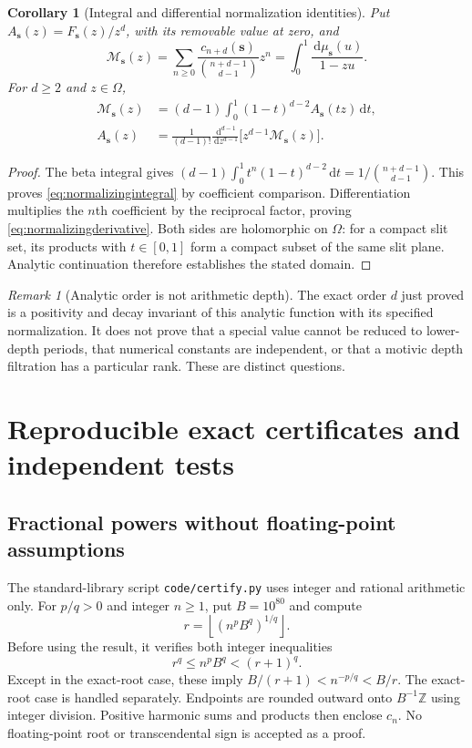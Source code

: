 \documentclass[11pt]{article}
\numberwithin{equation}{section}
\newtheorem{corollary}[theorem]{Corollary}
\theoremstyle{definition}
\theoremstyle{remark}
\newtheorem{remark}[theorem]{Remark}
\newcommand{\dd}{\,\mathrm d}
\newcommand{\cut}{\Omega}
\newcommand{\sv}{\boldsymbol s}
\begin{document}
\begin{corollary}[Integral and differential normalization identities]
\label{cor:normalizingidentities}
Put $A_{\sv}(z)=F_{\sv}(z)/z^d$, with its removable value at zero, and
\[
 \mathcal M_{\sv}(z)=\sum_{n\ge0}
       \frac{c_{n+d}(\sv)}{\binom{n+d-1}{d-1}}z^n
       =\int_0^1\frac{\dd\mu_{\sv}(u)}{1-zu}.
\]
For $d\ge2$ and $z\in\cut$,
\begin{align}
 \mathcal M_{\sv}(z)
 &=(d-1)\int_0^1(1-t)^{d-2}A_{\sv}(tz)\dd t,
 \label{eq:normalizingintegral}\\
 A_{\sv}(z)
 &=\frac1{(d-1)!}\frac{\dd^{d-1}}{\dd z^{d-1}}
                       \bigl[z^{d-1}\mathcal M_{\sv}(z)\bigr].
 \label{eq:normalizingderivative}
\end{align}
\end{corollary}
\begin{proof}
The beta integral gives
$(d-1)\int_0^1t^n(1-t)^{d-2}\dd t=1/\binom{n+d-1}{d-1}$.
This proves \eqref{eq:normalizingintegral} by coefficient comparison.
Differentiation multiplies the $n$th coefficient by the reciprocal
factor, proving \eqref{eq:normalizingderivative}. Both sides are
holomorphic on $\cut$: for a compact slit set, its products with
$t\in[0,1]$ form a compact subset of the same slit plane. Analytic
continuation therefore establishes the stated domain.
\end{proof}

\begin{remark}[Analytic order is not arithmetic depth]
The exact order $d$ just proved is a positivity and decay invariant of
this analytic function with its specified normalization. It does not
prove that a special value cannot be reduced to lower-depth periods,
that numerical constants are independent, or that a motivic depth
filtration has a particular rank. These are distinct questions.
\end{remark}

\section{Reproducible exact certificates and independent tests}
\label{sec:certificates}
\subsection{Fractional powers without floating-point assumptions}
The standard-library script \texttt{code/certify.py} uses integer and
rational arithmetic only. For $p/q>0$ and integer $n\ge1$, put $B=10^{80}$
and compute
\[
 r=\left\lfloor(n^pB^q)^{1/q}\right\rfloor.
\]
Before using the result, it verifies both integer inequalities
\begin{equation}\label{eq:rootcertificate}
 r^q\le n^pB^q<(r+1)^q.
\end{equation}
Except in the exact-root case, these imply
$B/(r+1)<n^{-p/q}<B/r$. The exact-root case is handled separately.
Endpoints are rounded outward onto $B^{-1}\mathbb Z$ using integer
division. Positive harmonic sums and products then enclose $c_n$.
No floating-point root or transcendental sign is accepted as a proof.
\end{document}
